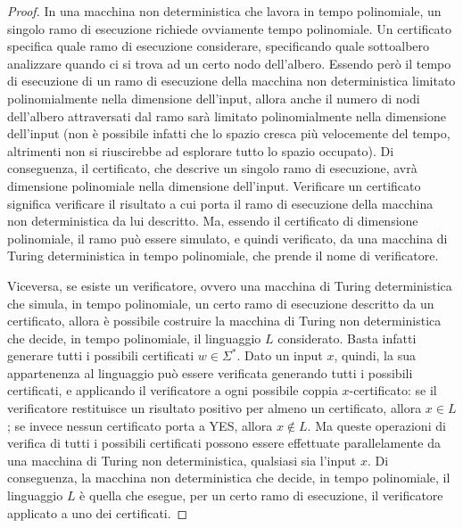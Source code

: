 \begin{proof}
    In una macchina non deterministica che lavora in tempo polinomiale, un singolo ramo di esecuzione richiede ovviamente tempo polinomiale.
    Un certificato specifica quale ramo di esecuzione considerare, specificando quale sottoalbero analizzare quando ci si trova ad un certo nodo dell'albero.
    Essendo però il tempo di esecuzione di un ramo di esecuzione della macchina non deterministica limitato polinomialmente nella dimensione dell'input, allora anche il numero di nodi dell'albero attraversati dal ramo sarà limitato polinomialmente nella dimensione dell'input (non è possibile infatti che lo spazio cresca più velocemente del tempo, altrimenti non si riuscirebbe ad esplorare tutto lo spazio occupato).
    Di conseguenza, il certificato, che descrive un singolo ramo di esecuzione, avrà dimensione polinomiale nella dimensione dell'input.
    Verificare un certificato significa verificare il risultato a cui porta il ramo di esecuzione della macchina non deterministica da lui descritto.
    Ma, essendo il certificato di dimensione polinomiale, il ramo può essere simulato, e quindi verificato, da una macchina di Turing deterministica in tempo polinomiale, che prende il nome di verificatore.

    Viceversa, se esiste un verificatore, ovvero una macchina di Turing deterministica che simula, in tempo polinomiale, un certo ramo di esecuzione descritto da un certificato, allora è possibile costruire la macchina di Turing non deterministica che decide, in tempo polinomiale, il linguaggio $L$ considerato.
    Basta infatti generare tutti i possibili certificati $w \in \Sigma^*$. Dato un input $x$, quindi, la sua appartenenza al linguaggio può essere verificata generando tutti i possibili certificati, e applicando il verificatore a ogni possibile coppia $x$-certificato: se il verificatore restituisce un risultato positivo per almeno un certificato, allora $x \in L$; se invece nessun certificato porta a YES, allora $x \notin L$.
    Ma queste operazioni di verifica di tutti i possibili certificati possono essere effettuate parallelamente da una macchina di Turing non deterministica, qualsiasi sia l'input $x$.
    Di conseguenza, la macchina non deterministica che decide, in tempo polinomiale, il linguaggio $L$ è quella che esegue, per un certo ramo di esecuzione, il verificatore applicato a uno dei certificati.
\end{proof}

